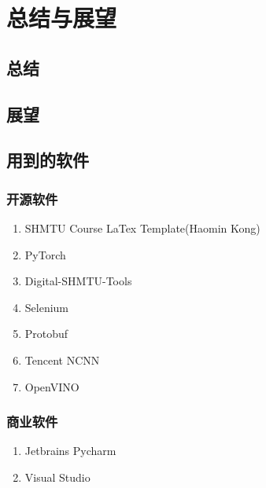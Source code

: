 \chapter{总结与展望}
\label{chapter:12}

\section{总结}

\section{展望}

\section{用到的软件}

\subsection{开源软件}

\begin{enumerate}
	\item SHMTU Course LaTex Template(Haomin Kong)\cite{shmtu_course_latex_template}
	\item PyTorch\cite{pytorch}
	\item Digital-SHMTU-Tools\cite{digit_shmtu}
	\item Selenium
	\item Protobuf
	\item Tencent NCNN
	\item OpenVINO
\end{enumerate}

\subsection{商业软件}

\begin{enumerate}
	\item Jetbrains Pycharm
	\item Visual Studio
\end{enumerate}
